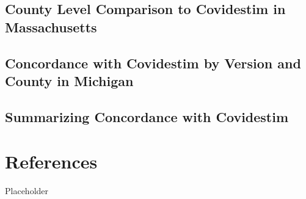 \documentclass[12pt,twoside]{smiththesis}
\begin{document}
\hypertarget{county-level-comparison-to-covidestim-in-massachusetts}{%
\section{County Level Comparison to Covidestim in Massachusetts}\label{county-level-comparison-to-covidestim-in-massachusetts}}

\hypertarget{concordance-with-covidestim-by-version-and-county-in-michigan}{%
\section{Concordance with Covidestim by Version and County in Michigan}\label{concordance-with-covidestim-by-version-and-county-in-michigan}}

\hypertarget{summarizing-concordance-with-covidestim-1}{%
\section{Summarizing Concordance with Covidestim}\label{summarizing-concordance-with-covidestim-1}}

\hypertarget{references}{%
\chapter*{References}\label{references}}

Placeholder
\end{document}
